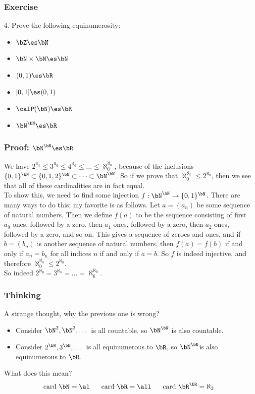 \documentclass{beamer}
\begin{document}
\begin{frame}
    \frametitle{Exercise}
    4. Prove the following equinumerosity:
    \begin{itemize}
        \item $\bZ\es\bN$
        \item $\bN \times \bN \es \bN$
        \item $(0,1) \es \bR$
        \item $[0,1] \es (0,1)$
        \item $\calP (\bN) \es \bR$
        \item $\bN^\bN \es \bR$
    \end{itemize}
    \vs{2em}
\end{frame}
\begin{frame}
    \frametitle{Proof: $\bN^\bN \es \bR$}
    \hh We have $2^{\aleph_0} \leq 3^{\aleph_0} \leq 4^{\aleph_0} \leq \dots \leq \aleph_0^{\aleph_0}$, because of the inclusions $\{0, 1\}^\bN \subset \{0,1,2\}^\bN \subset \dots \subset \bN^\bN$. 
    So if we prove that $\aleph_0^{\aleph_0} \leq 2^{\aleph_0}$, then we see that all of these cardinalities are in fact equal. 
    \\\vs{0.5em}
    \hh To show this, we need to find some injection $f: \bN^{\bN} \to \{0, 1\}^\bN$. There are many ways to do this; my favorite is as follows. Let $a = (a_n)$ be some sequence of natural numbers. 
    Then we define $f(a)$ to be the sequence consisting of first $a_0$ ones, followed by a zero, then $a_1$ ones, followed by a zero, then $a_2$ ones, followed by a zero, and so on. 
    This gives a sequence of zeroes and ones, and if $b = (b_n)$ is another sequence of natural numbers, then $f(a) = f(b)$ if and only if $a_n =b_n$ for all indices $n$ if and only if $a = b$. So $f$ is indeed injective, 
    and therefore $\aleph_0^{\aleph_0} \leq 2^{\aleph_0}$.
    \\\vs{0.5em}
    \hh So indeed $2^{\aleph_0} = 3^{\aleph_0} = \dots = \aleph_0^{\aleph_0}$. 
\end{frame}
\begin{frame}
    \frametitle{Thinking}
    A strange thought, why the previous one is wrong?
    \begin{itemize}
        \item Consider $\bN^2,\bN^3,\dots$ is all countable, so $\bN^\bN$ is also countable.
        \item Consider $2^\bN,3^\bN,\dots$ is all equinumerous to $\bR$, so $\bN^\bN$is also equinumerous to $\bR$.
    \end{itemize}
    \vv
    What does this mean?\\
    $$\text{card } \bN = \al ~~~~~\text{card }\bR = \all ~~~~~ \text{card } \bR^\bR = \aleph_2$$

\end{frame}
\end{document}
